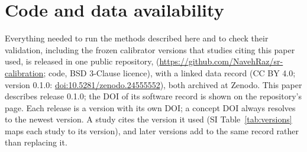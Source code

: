 \section*{Code and data availability}\label{sec:availability}

Everything needed to run the methods described here and to check their validation, including the frozen calibrator
versions that studies citing this paper used, is released in one public repository, 
(\url{https://github.com/NavehRaz/sr-calibration}; code, BSD 3-Clause licence), with a linked data record (CC BY 4.0;
version 0.1.0: \href{https://doi.org/10.5281/zenodo.24555552}{doi:10.5281/zenodo.24555552}), both archived at Zenodo.
This paper describes release 0.1.0; the DOI of its software record is shown on the repository's page. Each release is a
version with its own DOI; a concept DOI always resolves to the newest version. A study cites the version it used (SI
Table~\ref{tab:versions} maps each study to its version), and later versions add to the same record rather than
replacing it.
